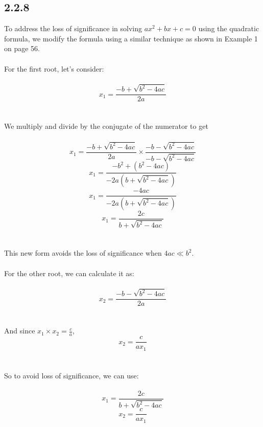 \documentclass{article}
\begin{document}
\subsection*{2.2.8}
To address the loss of significance in solving \( ax^2 + bx + c = 0 \) using the quadratic formula, we modify the formula using a similar technique as shown in Example 1 on page 56.
\\
\\
For the first root, let's consider:
\\
\\
\[
x_1 = \frac{{-b + \sqrt{{b^2 - 4ac}}}}{2a}
\]
\\
\\
We multiply and divide by the conjugate of the numerator to get
\\
\\
\[
x_1 = \frac{{-b + \sqrt{{b^2 - 4ac}}}}{2a} \times \frac{{-b - \sqrt{{b^2 - 4ac}}}}{-b - \sqrt{{b^2 - 4ac}}}
\]
\[
x_1 = \frac{{-b^2 + (b^2 - 4ac)}}{-2a(b + \sqrt{{b^2 - 4ac}})}
\]
\[
x_1 = \frac{{-4ac}}{-2a(b + \sqrt{{b^2 - 4ac}})}
\]
\[
x_1 = \frac{{2c}}{b + \sqrt{{b^2 - 4ac}}}
\]
\\
\\
This new form avoids the loss of significance when \( 4ac \ll b^2 \).
\\
\\
For the other root, we can calculate it as:
\\
\\
\[
x_2 = \frac{{-b - \sqrt{{b^2 - 4ac}}}}{2a}
\]
\\
\\
And since \( x_1 \times x_2 = \frac{c}{a} \),
\[
x_2 = \frac{c}{ax_1}
\]
\\
\\
So to avoid loss of significance, we can use:
\\
\\
\[
x_1 = \frac{{2c}}{b + \sqrt{{b^2 - 4ac}}}
\]
\[
x_2 = \frac{c}{ax_1}
\]
\end{document}

